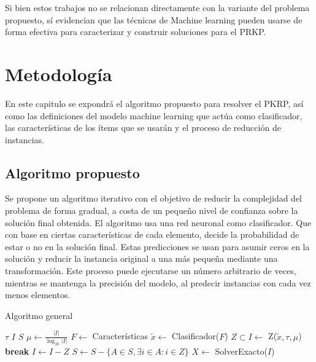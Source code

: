 \documentclass[spanish, a4paper, 12pt, openany,final]{book}
\begin{document}
Si bien estos trabajos no se relacionan directamente con la variante del problema propuesto, sí evidencian que las técnicas de Machine learning pueden usarse de forma efectiva para caracterizar y construir soluciones para el PRKP.
  



\chapter{Metodología}

En este capitulo se expondrá el algoritmo propuesto para resolver el PKRP, así como las definiciones del modelo machine learning que actúa como clasificador, las características de los ítems que se usarán y el proceso de reducción de instancias.

\section{Algoritmo propuesto}

Se propone un algoritmo iterativo con el objetivo de reducir la complejidad del problema de forma gradual, a costa de un pequeño nivel de confianza sobre la solución final obtenida. El algoritmo usa una red neuronal como clasificador. Que con base en ciertas características de cada elemento, decide la probabilidad de estar o no en la solución final. Estas predicciones se usan para asumir ceros en la solución y reducir la instancia original a una más pequeña mediante una transformación. Este proceso puede ejecutarse un número arbitrario de veces, mientras se mantenga la precisión del modelo, al predecir instancias con cada vez menos elementos.

\begin{algorithm}[H]
	\caption{Algoritmo general}\label{alg:general}
	\begin{algorithmic}[1]
		\State $\tau$ \label{alg1:def_tau} 
		\State $I$ \label{alg1:I} 
		\State $S$ \label{alg1:sinergias} 
		\Loop
		\State $\mu \gets \frac{|I|}{\log_{10}{|I|}}$ \label{alg1:def_mu} 
		\State $F \gets$ Características \label{alg1:full_features} 
		\State $\tilde{x} \gets$ Clasificador($F$) \label{alg1:get_pred} 
		\State $Z \subset I \gets$ Z($\tilde{x},\tau,\mu$) \label{alg1:get_Z} 
		 \label{alg1:break_condition}
		\State \textbf{break}
		\EndIf
		\State $I \gets I-Z$  \label{alg1:update_I}
		\State $S \gets S - \{A \in S, \exists i \in A: i \in Z\}$ 
		\EndLoop
		\State $X \gets$ SolverExacto($I$) \label{alg1:exact_solver} 
	\end{algorithmic}
\end{algorithm}
\end{document}
